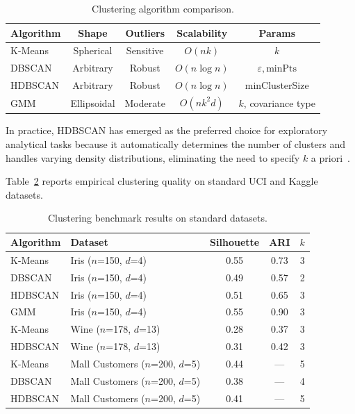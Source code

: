 \documentclass[12pt, a4paper]{article}
\begin{document}
\begin{table}[ht]
\centering
\caption{Clustering algorithm comparison.}
\label{tab:clustering}
\begin{tabular}{lcccc}
\toprule
\textbf{Algorithm} & \textbf{Shape} & \textbf{Outliers} & \textbf{Scalability} & \textbf{Params} \\
\midrule
K-Means   & Spherical  & Sensitive   & $O(nk)$      & $k$ \\
DBSCAN    & Arbitrary  & Robust      & $O(n \log n)$ & $\varepsilon, \text{minPts}$ \\
HDBSCAN   & Arbitrary  & Robust      & $O(n \log n)$ & minClusterSize \\
GMM       & Ellipsoidal & Moderate   & $O(nk^2d)$   & $k$, covariance type \\
\bottomrule
\end{tabular}
\end{table}

In practice, HDBSCAN has emerged as the preferred choice for exploratory analytical tasks because it automatically determines the number of clusters and handles varying density distributions, eliminating the need to specify $k$ a priori~\citep{mcinnes2017hdbscan}.

Table~\ref{tab:clustering-benchmarks} reports empirical clustering quality on standard UCI and Kaggle datasets.

\begin{table}[ht]
\centering
\caption{Clustering benchmark results on standard datasets.}
\label{tab:clustering-benchmarks}
\begin{tabular}{llccr}
\toprule
\textbf{Algorithm} & \textbf{Dataset} & \textbf{Silhouette} & \textbf{ARI} & \textbf{$k$} \\
\midrule
K-Means & Iris ($n$=150, $d$=4)           & 0.55 & 0.73 & 3 \\
DBSCAN  & Iris ($n$=150, $d$=4)           & 0.49 & 0.57 & 2 \\
HDBSCAN & Iris ($n$=150, $d$=4)           & 0.51 & 0.65 & 3 \\
GMM     & Iris ($n$=150, $d$=4)           & 0.55 & 0.90 & 3 \\
\midrule
K-Means & Wine ($n$=178, $d$=13)          & 0.28 & 0.37 & 3 \\
HDBSCAN & Wine ($n$=178, $d$=13)          & 0.31 & 0.42 & 3 \\
\midrule
K-Means & Mall Customers ($n$=200, $d$=5) & 0.44 & ---  & 5 \\
DBSCAN  & Mall Customers ($n$=200, $d$=5) & 0.38 & ---  & 4 \\
HDBSCAN & Mall Customers ($n$=200, $d$=5) & 0.41 & ---  & 5 \\
\bottomrule
\end{tabular}
\end{table}
\end{document}
